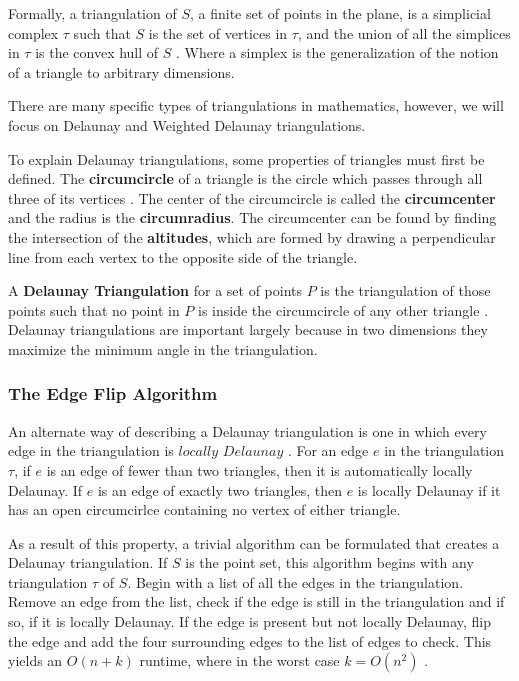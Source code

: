 \documentclass[11pt]{article}
\begin{document}
Formally, a triangulation of $S$, a finite set of points in the plane, is a simplicial complex $\tau$ such that $S$ is the set of vertices in $\tau$, and the union of all the simplices in $\tau$ is the convex hull of $S$ \cite{meshGeneration}. Where a simplex is the generalization of the notion of a triangle to arbitrary dimensions.

There are many specific types of triangulations in mathematics, however, we will focus on Delaunay and Weighted Delaunay triangulations.

To explain Delaunay triangulations, some properties of triangles must first be defined. The \textbf{circumcircle} of a triangle is the circle which passes through all three of its vertices \cite{mathworld:Circumcenter}. The center of the circumcircle is called the \textbf{circumcenter} and the radius is the \textbf{circumradius}. The circumcenter can be found by finding the intersection of the \textbf{altitudes}, which are formed by drawing a perpendicular line from each vertex to the opposite side of the triangle.
  
A \textbf{Delaunay Triangulation} for a set of points $P$ is the triangulation of those points such that no point in $P$ is inside the circumcircle of any other triangle \cite{meshGeneration}. Delaunay triangulations are important largely because in two dimensions they maximize the minimum angle in the triangulation.

\subsubsection{The Edge Flip Algorithm}
An alternate way of describing a Delaunay triangulation is one in which every edge in the triangulation is $locally$ $Delaunay$ \cite{meshGeneration}. For an edge $e$ in the triangulation $\tau$, if $e$ is an edge of fewer than two triangles, then it is automatically locally Delaunay. If $e$ is an edge of exactly two triangles, then $e$ is locally Delaunay if it has an open circumcirlce containing no vertex of either triangle. 

As a result of this property, a trivial algorithm can be formulated that creates a Delaunay triangulation. If $S$ is the point set, this algorithm begins with any triangulation $\tau$ of $S$. Begin with a list of all the edges in the triangulation. Remove an edge from the list, check if the edge is still in the triangulation and if so, if it is locally Delaunay. If the edge is present but not locally Delaunay, flip the edge and add the four surrounding edges to the list of edges to check. This yields an $O(n + k)$ runtime, where in the worst case $k = O(n^2)$ \cite{meshGeneration}.
\end{document}
